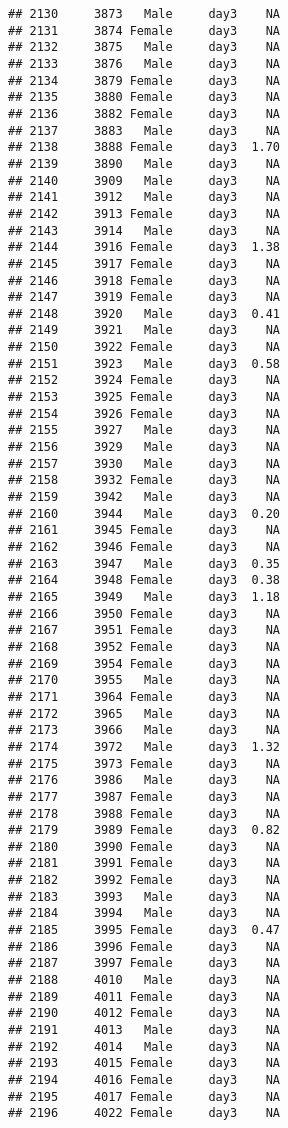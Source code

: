 \documentclass[
]{article}
\begin{document}
\begin{verbatim}
## 2130     3873   Male     day3    NA
## 2131     3874 Female     day3    NA
## 2132     3875   Male     day3    NA
## 2133     3876   Male     day3    NA
## 2134     3879 Female     day3    NA
## 2135     3880 Female     day3    NA
## 2136     3882 Female     day3    NA
## 2137     3883   Male     day3    NA
## 2138     3888 Female     day3  1.70
## 2139     3890   Male     day3    NA
## 2140     3909   Male     day3    NA
## 2141     3912   Male     day3    NA
## 2142     3913 Female     day3    NA
## 2143     3914   Male     day3    NA
## 2144     3916 Female     day3  1.38
## 2145     3917 Female     day3    NA
## 2146     3918 Female     day3    NA
## 2147     3919 Female     day3    NA
## 2148     3920   Male     day3  0.41
## 2149     3921   Male     day3    NA
## 2150     3922 Female     day3    NA
## 2151     3923   Male     day3  0.58
## 2152     3924 Female     day3    NA
## 2153     3925 Female     day3    NA
## 2154     3926 Female     day3    NA
## 2155     3927   Male     day3    NA
## 2156     3929   Male     day3    NA
## 2157     3930   Male     day3    NA
## 2158     3932 Female     day3    NA
## 2159     3942   Male     day3    NA
## 2160     3944   Male     day3  0.20
## 2161     3945 Female     day3    NA
## 2162     3946 Female     day3    NA
## 2163     3947   Male     day3  0.35
## 2164     3948 Female     day3  0.38
## 2165     3949   Male     day3  1.18
## 2166     3950 Female     day3    NA
## 2167     3951 Female     day3    NA
## 2168     3952 Female     day3    NA
## 2169     3954 Female     day3    NA
## 2170     3955   Male     day3    NA
## 2171     3964 Female     day3    NA
## 2172     3965   Male     day3    NA
## 2173     3966   Male     day3    NA
## 2174     3972   Male     day3  1.32
## 2175     3973 Female     day3    NA
## 2176     3986   Male     day3    NA
## 2177     3987 Female     day3    NA
## 2178     3988 Female     day3    NA
## 2179     3989 Female     day3  0.82
## 2180     3990 Female     day3    NA
## 2181     3991 Female     day3    NA
## 2182     3992 Female     day3    NA
## 2183     3993   Male     day3    NA
## 2184     3994   Male     day3    NA
## 2185     3995 Female     day3  0.47
## 2186     3996 Female     day3    NA
## 2187     3997 Female     day3    NA
## 2188     4010   Male     day3    NA
## 2189     4011 Female     day3    NA
## 2190     4012 Female     day3    NA
## 2191     4013   Male     day3    NA
## 2192     4014   Male     day3    NA
## 2193     4015 Female     day3    NA
## 2194     4016 Female     day3    NA
## 2195     4017 Female     day3    NA
## 2196     4022 Female     day3    NA

\end{verbatim}
\end{document}
